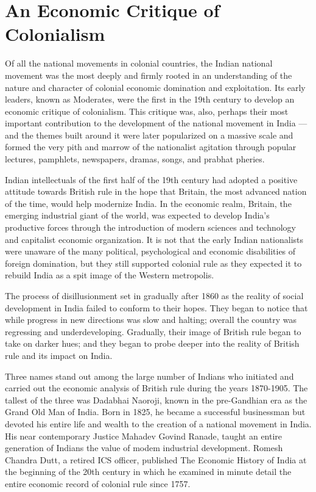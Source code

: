 \chapter{An Economic Critique of Colonialism}

Of all the national movements in colonial countries, the Indian national movement was the most deeply and firmly rooted in an understanding of the nature and character of colonial economic domination and exploitation. Its early leaders, known as Moderates, were the first in the 19th century to develop an economic critique of colonialism. This critique was, also, perhaps their most important contribution to the development of the national movement in India — and the themes built around it were later popularized on a massive scale and formed the very pith and marrow of the nationalist agitation through popular lectures, pamphlets, newspapers, dramas, songs, and prabhat pheries.

Indian intellectuals of the first half of the 19th century had adopted a positive attitude towards British rule in the hope that Britain, the most advanced nation of the time, would help modernize India. In the economic realm, Britain, the emerging industrial giant of the world, was expected to develop India’s productive forces through the introduction of modern sciences and technology and capitalist economic organization. It is not that the early Indian nationalists were unaware of the many political, psychological and economic disabilities of foreign domination, but they still supported colonial rule as they expected it to rebuild India as a spit image of the Western metropolis.

The process of disillusionment set in gradually after 1860 as the reality of social development in India failed to conform to their hopes. They began to notice that while progress in new directions was slow and halting; overall the country was regressing and underdeveloping. Gradually, their image of British rule began to take on darker hues; and they began to probe deeper into the reality of British rule and its impact on India.

Three names stand out among the large number of Indians who initiated and carried out the economic analysis of British rule during the years 1870-1905. The tallest of the three was Dadabhai Naoroji, known in the pre-Gandhian era as the Grand Old Man of India. Born in 1825, he became a successful businessman but devoted his entire life and wealth to the creation of a national movement in India. His near contemporary Justice Mahadev Govind Ranade, taught an entire generation of Indians the value of modem industrial development. Romesh Chandra Dutt, a retired ICS officer, published The Economic History of India at the beginning of the 20th century in which he examined in minute detail the entire economic record of colonial rule since 1757.

